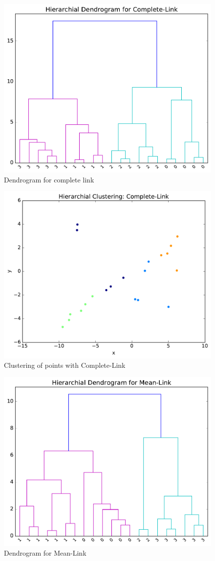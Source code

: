 \documentclass[11pt]{article}
\begin{document}
\begin{figure}[H]
\centering
\includegraphics[width=.75\textwidth]{Complete-Link_dendro.pdf}
\caption{Dendrogram for complete link}
\end{figure}

\begin{figure}[H]
\centering
\includegraphics[width=.75\textwidth]{Complete-Link.pdf}
\caption{Clustering of points with Complete-Link}
\end{figure}

\begin{figure}[H]
\centering
\includegraphics[width=.75\textwidth]{Mean-Link_dendro.pdf}
\caption{Dendrogram for Mean-Link}
\end{figure}
\end{document}
